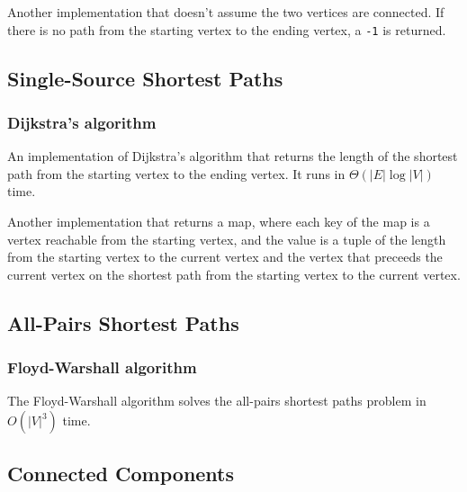 \documentclass[11pt,a4paper,titlepage]{article}
\begin{document}
			Another implementation that doesn't assume the two vertices are connected. If there is no path from the starting vertex to the ending vertex, a \lstinline$-1$ is returned.
			


		\subsection{Single-Source Shortest Paths}
			\subsubsection{Dijkstra's algorithm}
				An implementation of Dijkstra's algorithm that returns the length of the shortest path from the starting vertex to the ending vertex. It runs in $\Theta(|E|\log{|V|})$ time.
				

				Another implementation that returns a map, where each key of the map is a vertex reachable from the starting vertex, and the value is a tuple of the length from the starting vertex to the current vertex and the vertex that preceeds the current vertex on the shortest path from the starting vertex to the current vertex.
				
		\subsection{All-Pairs Shortest Paths}
			\subsubsection{Floyd-Warshall algorithm}
				The Floyd-Warshall algorithm solves the all-pairs shortest paths problem in $O(|V|^3)$ time.
				
		\subsection{Connected Components}
\end{document}
